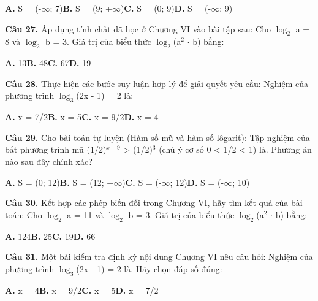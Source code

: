 \documentclass[11pt,a4paper]{article}
\begin{document}
\hspace*{1.5em}\textbf{A.} S = (-$\infty$; 7)\quad\quad \textbf{B.} S = (9; +$\infty$)\quad\quad \textbf{C.} S = (0; 9)\quad\quad \textbf{D.} S = (-$\infty$; 9)\par\vspace{2pt}
\textbf{\color{primary} Câu 27.} Áp dụng tính chất đã học ở Chương VI vào bài tập sau: Cho $\log_2$ a = 8 và $\log_2$ b = 3. Giá trị của biểu thức $\log_2$(a$^2$ $\cdot$ b) bằng:\par
\hspace*{1.5em}\textbf{A.} 13\quad\quad \textbf{B.} 48\quad\quad \textbf{C.} 67\quad\quad \textbf{D.} 19\par\vspace{2pt}
\textbf{\color{primary} Câu 28.} Thực hiện các bước suy luận hợp lý để giải quyết yêu cầu: Nghiệm của phương trình $\log_3$(2x - 1) = 2 là:\par
\hspace*{1.5em}\textbf{A.} x = 7/2\quad\quad \textbf{B.} x = 5\quad\quad \textbf{C.} x = 9/2\quad\quad \textbf{D.} x = 4\par\vspace{2pt}
\textbf{\color{primary} Câu 29.} Cho bài toán tự luyện (Hàm số mũ và hàm số lôgarit): Tập nghiệm của bất phương trình mũ (1/2)$^{x - 9}$ > (1/2)$^3$ (chú ý cơ số 0 < 1/2 < 1) là. Phương án nào sau đây chính xác?\par
\hspace*{1.5em}\textbf{A.} S = (0; 12)\quad\quad \textbf{B.} S = (12; +$\infty$)\quad\quad \textbf{C.} S = (-$\infty$; 12)\quad\quad \textbf{D.} S = (-$\infty$; 10)\par\vspace{2pt}
\textbf{\color{primary} Câu 30.} Kết hợp các phép biến đổi trong Chương VI, hãy tìm kết quả của bài toán: Cho $\log_2$ a = 11 và $\log_2$ b = 3. Giá trị của biểu thức $\log_2$(a$^2$ $\cdot$ b) bằng:\par
\hspace*{1.5em}\textbf{A.} 124\quad\quad \textbf{B.} 25\quad\quad \textbf{C.} 19\quad\quad \textbf{D.} 66\par\vspace{2pt}
\textbf{\color{primary} Câu 31.} Một bài kiểm tra định kỳ nội dung Chương VI nêu câu hỏi: Nghiệm của phương trình $\log_3$(2x - 1) = 2 là. Hãy chọn đáp số đúng:\par
\hspace*{1.5em}\textbf{A.} x = 4\quad\quad \textbf{B.} x = 9/2\quad\quad \textbf{C.} x = 5\quad\quad \textbf{D.} x = 7/2\par\vspace{2pt}
\end{document}
